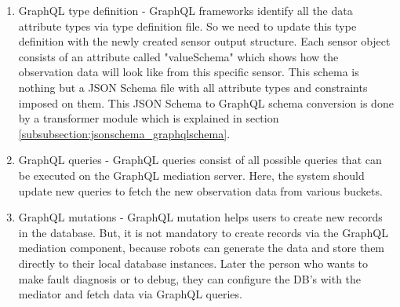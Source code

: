 	\begin{enumerate}
		\item GraphQL type definition - GraphQL frameworks identify all the data attribute types via type definition file. So we need to update this type definition with the newly created sensor output structure. Each sensor object consists of an attribute called "valueSchema" which shows how the observation data will look like from this specific sensor. This schema is nothing but a JSON Schema file with all attribute types and constraints imposed on them. This JSON Schema to GraphQL schema conversion is done by a transformer module which is explained in section \ref{subsubsection:jsonschema_graphqlschema}.
		
		\item GraphQL queries - GraphQL queries consist of all possible queries that can be executed on the GraphQL mediation server. Here, the system should update new queries to fetch the new observation data from various buckets.
		
		\item GraphQL mutations - GraphQL mutation helps users to create new records in the database. But, it is not mandatory to create records via the GraphQL mediation component, because robots can generate the data and store them directly to their local database instances. Later the person who wants to make fault diagnosis or to debug, they can configure the DB's with the mediator and fetch data via GraphQL queries.
	\end{enumerate}

